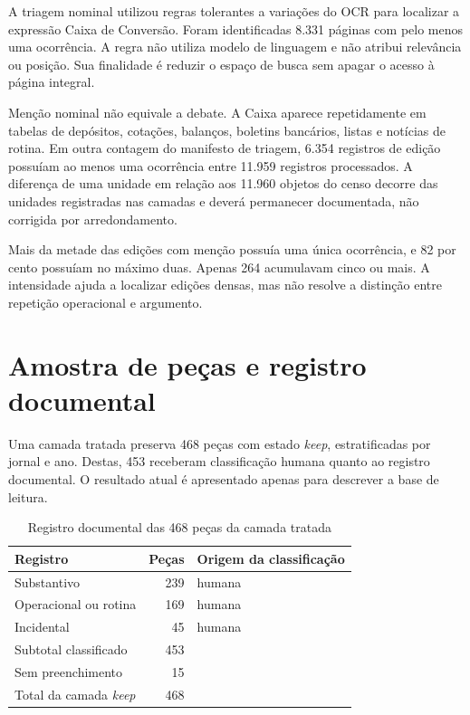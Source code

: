 A triagem nominal utilizou regras tolerantes a variações do OCR para localizar a expressão Caixa de Conversão. Foram identificadas 8.331 páginas com pelo menos uma ocorrência. A regra não utiliza modelo de linguagem e não atribui relevância ou posição. Sua finalidade é reduzir o espaço de busca sem apagar o acesso à página integral.

Menção nominal não equivale a debate. A Caixa aparece repetidamente em tabelas de depósitos, cotações, balanços, boletins bancários, listas e notícias de rotina. Em outra contagem do manifesto de triagem, 6.354 registros de edição possuíam ao menos uma ocorrência entre 11.959 registros processados. A diferença de uma unidade em relação aos 11.960 objetos do censo decorre das unidades registradas nas camadas e deverá permanecer documentada, não corrigida por arredondamento.

Mais da metade das edições com menção possuía uma única ocorrência, e 82 por cento possuíam no máximo duas. Apenas 264 acumulavam cinco ou mais. A intensidade ajuda a localizar edições densas, mas não resolve a distinção entre repetição operacional e argumento.

\section{Amostra de peças e registro documental}

Uma camada tratada preserva 468 peças com estado \textit{keep}, estratificadas por jornal e ano. Destas, 453 receberam classificação humana quanto ao registro documental. O resultado atual é apresentado apenas para descrever a base de leitura.

\begin{table}[ht]
\centering
\caption{Registro documental das 468 peças da camada tratada}
\begin{tabular}{lrl}
\toprule
Registro & Peças & Origem da classificação \\
\midrule
Substantivo & 239 & humana \\
Operacional ou rotina & 169 & humana \\
Incidental & 45 & humana \\
\midrule
Subtotal classificado & 453 & \\
Sem preenchimento & 15 & \\
\midrule
Total da camada \textit{keep} & 468 & \\
\bottomrule
\end{tabular}
\end{table}

